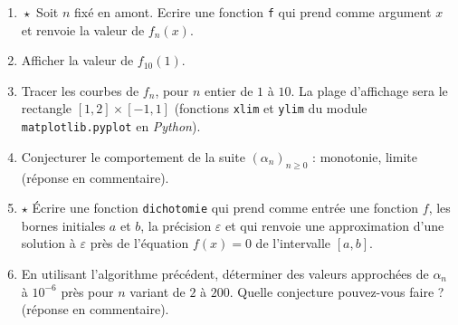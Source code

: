 \begin{enumerate}
\item $\!\star$ Soit $n$ fixé en amont. Ecrire une fonction \verb?f? qui prend comme argument $x$ et renvoie la valeur de $f_n(x)$.
\item Afficher la valeur de $f_{10}(1)$.
\item Tracer les courbes de $f_n$, pour $n$ entier de $1$ à $10$. La plage d'affichage sera le rectangle $[1, 2]\times [-1, 1]$ (fonctions \texttt{xlim} et \texttt{ylim} du module \texttt{matplotlib.pyplot} en \textit{Python}). 
\item Conjecturer le comportement de la suite $(\alpha_n)_{n\geq  0}$ : monotonie, limite (réponse en commentaire).
\item $\star$ Écrire une fonction \verb?dichotomie? qui prend comme entr\' ee une fonction $f$, les bornes initiales $a$ et $b$, la pr\' ecision $\varepsilon$ et qui renvoie une approximation d’une solution \` a $\varepsilon$ pr\` es de l'équation $f(x)=0$ de l'intervalle $[a,b]$.
\item En utilisant l'algorithme précédent, déterminer des valeurs approchées de $\alpha_n$ à $10^{-6}$ près pour $n$ variant de $2$ à $200$. Quelle conjecture pouvez-vous faire ? (réponse en commentaire).
\end{enumerate}
